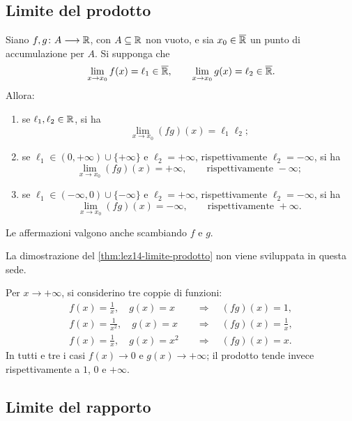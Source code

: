 \subsection{Limite del prodotto}
\label{sec:lez14-limite-prodotto}

\begin{theorem}
\label{thm:lez14-limite-prodotto}
Siano \(f,g\colon A\longrightarrow\mathbb{R}\), con
\(A\subseteq\mathbb{R}\) non vuoto, e sia
\(x_0\in\overline{\mathbb{R}}\) un punto di accumulazione per \(A\).
Si supponga che
\[
  \lim_{x\to x_0}f(x)=\ell_1\in\overline{\mathbb{R}},
  \qquad
  \lim_{x\to x_0}g(x)=\ell_2\in\overline{\mathbb{R}}.
\]
Allora:
\begin{enumerate}
  \item se \(\ell_1,\ell_2\in\mathbb{R}\), si ha
  \[
    \lim_{x\to x_0}(fg)(x)=\ell_1\ell_2;
  \]
  \item se \(\ell_1\in(0,+\infty)\cup\{+\infty\}\) e
  \(\ell_2=+\infty\), rispettivamente \(\ell_2=-\infty\),
  si ha
  \[
    \lim_{x\to x_0}(fg)(x)=+\infty,
    \qquad\text{rispettivamente }-\infty;
  \]
  \item se \(\ell_1\in(-\infty,0)\cup\{-\infty\}\) e
  \(\ell_2=+\infty\), rispettivamente \(\ell_2=-\infty\),
  si ha
  \[
    \lim_{x\to x_0}(fg)(x)=-\infty,
    \qquad\text{rispettivamente }+\infty.
  \]
\end{enumerate}
Le affermazioni valgono anche scambiando \(f\) e \(g\).
\end{theorem}

La dimostrazione del \cref{thm:lez14-limite-prodotto}
non viene sviluppata in questa sede.

\begin{example}
\label{ex:lez14-prodotto-indeterminato}
Per \(x\to+\infty\), si considerino tre coppie di funzioni:
\[
\begin{aligned}
  f(x)=\frac1x,\quad g(x)=x
    &\quad\Longrightarrow\quad (fg)(x)=1,\\
  f(x)=\frac1{x^2},\quad g(x)=x
    &\quad\Longrightarrow\quad (fg)(x)=\frac1x,\\
  f(x)=\frac1x,\quad g(x)=x^2
    &\quad\Longrightarrow\quad (fg)(x)=x.
\end{aligned}
\]
In tutti e tre i casi \(f(x)\to0\) e \(g(x)\to+\infty\);
il prodotto tende invece rispettivamente a \(1\), \(0\)
e \(+\infty\).
\end{example}

\subsection{Limite del rapporto}
\label{sec:lez14-limite-rapporto}

